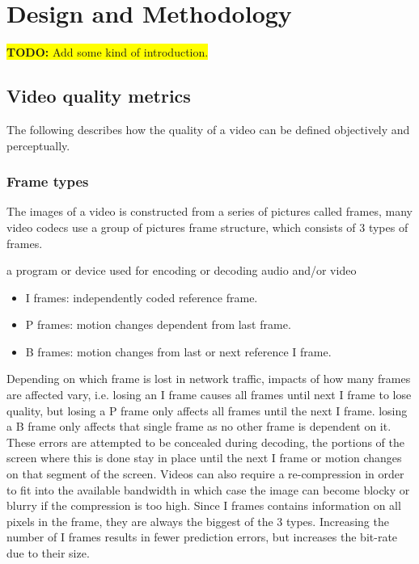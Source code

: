 \chapter{Design and Methodology}
\label{cha:design-and-method}

\colorbox{yellow}{\textbf{TODO:} Add some kind of introduction.}


\section{Video quality metrics}
The following describes how the quality of a video can be defined objectively and perceptually.

\subsection{Frame types}
The images of a video is constructed from a series of pictures called frames, many video codecs use a group of pictures frame structure, which consists of 3 types of frames.

a program or device used for encoding or decoding audio and/or video

\begin{itemize}
    \item I frames: independently coded reference frame.
    \item P frames: motion changes dependent from last frame.
    \item B frames: motion changes from last or next reference I frame.
\end{itemize}

Depending on which frame is lost in network traffic, impacts of how many frames are affected vary, i.e. losing an I frame causes all frames until next I frame to lose quality, but losing a P frame only affects all frames until the next I frame. losing a B frame only affects that single frame as no other frame is dependent on it.\\
These errors are attempted to be concealed during decoding, the portions of the screen where this is done stay in place until the next I frame or motion changes on that segment of the screen. Videos can also require a re-compression in order to fit into the available bandwidth in which case the image can become blocky or blurry if the compression is too high.
Since I frames contains information on all pixels in the frame, they are always the biggest of the 3 types. Increasing the number of I frames results in fewer prediction errors, but increases the bit-rate due to their size.


